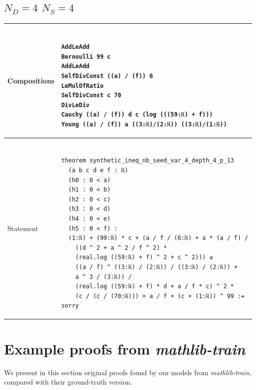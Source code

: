 \documentclass[nohyperref]{article}
\theoremstyle{plain}
\theoremstyle{definition}
\theoremstyle{remark}
\begin{document}
\newpage

\subsection*{$N_D=4$ $N_S=4$}
\begin{table}[h]
\begin{small}
\begin{tabular}{|p{3.5cm}|p{12.5cm}|} 
  \hline 
  \centering Compositions &
  \begin{minipage}{11 cm}
    \begin{verbatim} 

AddLeAdd
Bernoulli 99 c
AddLeAdd
SelfDivConst ((a) / (f)) 6
LeMulOfRatio
SelfDivConst c 70
DivLeDiv
Cauchy ((a) / (f)) d c (log (((59:ℝ) + f)))
Young ((a) / (f)) a ((3:ℝ)/(2:ℝ)) ((3:ℝ)/(1:ℝ))
    \end{verbatim}
  \end{minipage} \\
  \hline 
  \centering Statement &
  \begin{minipage}{11 cm}
    \begin{verbatim} 

theorem synthetic_ineq_nb_seed_var_4_depth_4_p_13
  (a b c d e f : ℝ)
  (h0 : 0 < a)
  (h1 : 0 < b)
  (h2 : 0 < c)
  (h3 : 0 < d)
  (h4 : 0 < e)
  (h5 : 0 < f) :
  (1:ℝ) + (99:ℝ) * c + (a / f / (6:ℝ) + a * (a / f) / 
    ((d ^ 2 + a ^ 2 / f ^ 2) * 
    (real.log ((59:ℝ) + f) ^ 2 + c ^ 2))) ≤
    ((a / f) ^ ((3:ℝ) / (2:ℝ)) / ((3:ℝ) / (2:ℝ)) + 
    a ^ 3 / (3:ℝ)) / 
    (real.log ((59:ℝ) + f) * d + a / f * c) ^ 2 * 
    (c / (c / (70:ℝ))) + a / f + (c + (1:ℝ)) ^ 99 := sorry
    \end{verbatim}
  \end{minipage} \\
  \hline
\end{tabular}
\end{small}
\end{table}

\newpage
\section{Example proofs from \textit{mathlib-train}}
\label{appendix-mathlib-proofs}

We present in this section original proofs found by our models from \textit{mathlib-train}, compared with their ground-truth version.
\end{document}
